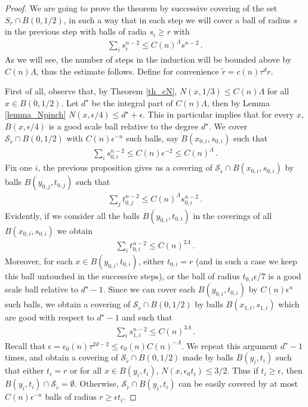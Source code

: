 \documentclass[11pt]{article}
\begin{document}
\begin{proof}
We are going to prove the theorem by successive covering of the set $S_r\cap B(0,1/2)$, in such a way that in each step we will cover a ball of radius $s$ in the previous step with balls of radia $s_i\geq r$ with
\begin{gather}
 \sum_i s_i^{n-2}\leq C(n)^\Lambda s^{n-2}\, .
\end{gather}
As we will see, the number of steps in the induction will be bounded above by $C(n)\Lambda$, thus the estimate follows. Define for convenience ${\tilde r}=c(n)\tau^{d} r$. 

First of all, observe that, by Theorem \ref{th_cN}, $N(x,1/3)\leq C(n)\Lambda$ for all $x\in B(0,1/2)$. Let $d^\star$ be the integral part of $C(n)\Lambda$, then by Lemma \ref{lemma_Npinch} $N(x,\epsilon/4)\leq d^\star + \epsilon$. This in particular implies that for every $x$, $B(x,\epsilon/4)$ is a good scale ball relative to the degree $d^\star$. We cover ${\mathcal{S}}_{\tilde r}\cap B(0,1/2)$ with $C(n)\epsilon^{-n}$ such balls, say $B(x_{0,i},s_{0,i})$ such that
\begin{gather}
 \sum_i s_{0,i}^{n-2}\leq C(n)\epsilon^{-2}\leq C(n)^{\Lambda}\, .
\end{gather}
Fix one $i$, the previous proposition gives us a covering of ${\mathcal{S}}_{\tilde r}\cap B(x_{0,i},s_{0,i})$ by balls $B(y_{0,j},t_{0,j})$ such that
\begin{gather}
 \sum_{j} t_{0,j}^{n-2} \leq C(n)^{\Lambda} s_{0,i}^{n-2}\, .
\end{gather}
Evidently, if we consider all the balls $B(y_{0,i},t_{0,i})$ in the coverings of all $B(x_{0,i},s_{0,i})$ we obtain
\begin{gather}
 \sum_i t_{0,i}^{n-2}\leq C(n)^{2\Lambda}\, .
\end{gather}
Moreover, for each $x\in B(y_{0,i},t_{0,i})$, either $t_{0,i}=r$ (and in such a case we keep this ball untouched in the successive steps), or the ball of radius $t_{0,i}\epsilon/7$ is a good scale ball relative to $d^\star -1$. Since we can cover each $B(y_{0,i},t_{0,i})$ by $C(n) \epsilon^{n}$ such balls, we obtain a covering of ${\mathcal{S}}_{\tilde r}\cap B(0,1/2)$ by balls $B(x_{1,i},s_{1,i})$ which are good with respect to $d^\star -1$ and such that
\begin{gather}
  \sum_i s_{1,i}^{n-2}\leq C(n)^{3\Lambda}\, .
\end{gather}
Recall that $\epsilon=\epsilon_0(n) \tau^{2d-2}\leq \epsilon_0(n) C(n)^{-\Lambda}$. We repeat this argument $d^\star -1$ times, and obtain a covering of ${\mathcal{S}}_{\tilde r}\cap B(0,1/2)$ made by balls $B(y_i,t_i)$ such that either $t_i=r$ or for all $x\in B(y_i,t_i)$, $N(x,\epsilon_0 t_i)\leq 3/2$. Thus if $t_i\geq \epsilon$, then $B(y_i,t_i)\cap {\mathcal{S}}_{\tilde r} = \emptyset$. Otherwise, ${\mathcal{S}}_{\tilde r}\cap B(y_i,t_i)$ can be easily covered by at most $C(n)\epsilon^{-n}$ balls of radius $r\geq \epsilon t_i$. 


\end{proof}
\end{document}

